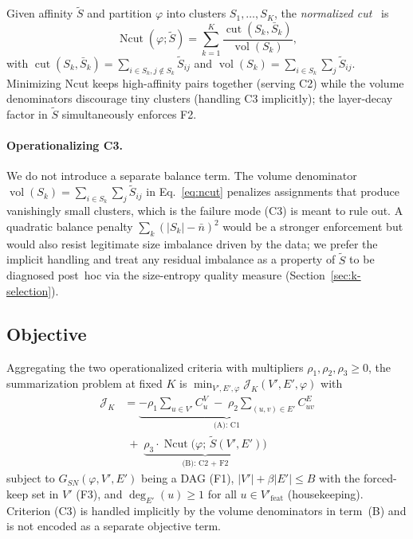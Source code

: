 \documentclass[table, 11pt]{article}
\DeclareMathOperator{\Ncut}{Ncut}
\DeclareMathOperator{\vol}{vol}
\DeclareMathOperator{\cut}{cut}
\begin{document}
Given affinity $\tilde S$ and partition $\varphi$ into clusters
$S_1, \ldots, S_K$, the \emph{normalized cut}~\cite{shi2000normalized}
is
\begin{equation}
\Ncut(\varphi; \tilde S) = \sum_{k=1}^{K}
\frac{\cut(S_k, \bar S_k)}{\vol(S_k)},
\label{eq:ncut}
\end{equation}
with $\cut(S_k, \bar S_k) = \sum_{i \in S_k, j \notin S_k} \tilde S_{ij}$
and $\vol(S_k) = \sum_{i \in S_k} \sum_j \tilde S_{ij}$. Minimizing
Ncut keeps high-affinity pairs together (serving C2) while the
volume denominators discourage tiny clusters (handling C3
implicitly); the layer-decay factor in $\tilde S$ simultaneously
enforces F2.

\paragraph{Operationalizing C3.}
We do not introduce a separate balance term. The volume denominator
$\vol(S_k) = \sum_{i \in S_k} \sum_j \tilde S_{ij}$ in
Eq.~\eqref{eq:ncut} penalizes assignments that produce vanishingly
small clusters, which is the failure mode (C3) is meant to rule
out. A quadratic balance penalty $\sum_k (|S_k| - \bar n)^2$ would
be a stronger enforcement but would also resist legitimate size
imbalance driven by the data; we prefer the implicit handling and
treat any residual imbalance as a property of $\tilde S$ to be
diagnosed post~hoc via the size-entropy quality measure
(Section~\ref{sec:k-selection}).

\subsection{Objective}\label{sec:objective}

Aggregating the two operationalized criteria with multipliers
$\rho_1, \rho_2, \rho_3 \ge 0$, the summarization problem at fixed
$K$ is $\min_{V', E', \varphi} \mathcal{J}_K(V', E', \varphi)$ with
\begin{align}
\mathcal{J}_K &= \underbrace{-\rho_1 \!\!\sum_{u \in V'}\!\! C^V_u
\;-\; \rho_2 \!\!\!\sum_{(u,v) \in E'}\!\!\!\! C^E_{uv}}_{\text{(A): C1}}
\nonumber\\[1pt]
&\;+\; \underbrace{\rho_3 \cdot \Ncut\bigl(\varphi;\, \tilde S(V', E')\bigr)}_{\text{(B): C2 + F2}}
\label{eq:objective}
\end{align}
subject to $G_{SN}(\varphi, V', E')$ being a DAG (F1),
$|V'| + \beta|E'| \le B$ with the forced-keep set in $V'$ (F3), and
$\deg_{E'}(u) \ge 1$ for all $u \in V'_{\text{feat}}$ (housekeeping).
Criterion (C3) is handled implicitly by the volume denominators in
term~(B) and is not encoded as a separate objective term.
\end{document}
